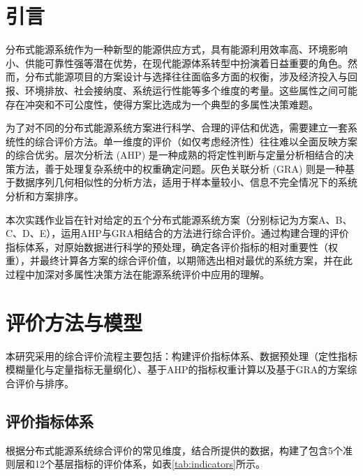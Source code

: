 \documentclass[12pt]{ctexart}
\begin{document}
\newpage
\section{引言}
分布式能源系统作为一种新型的能源供应方式，具有能源利用效率高、环境影响小、供能可靠性强等潜在优势，在现代能源体系转型中扮演着日益重要的角色。然而，分布式能源项目的方案设计与选择往往面临多方面的权衡，涉及经济投入与回报、环境排放、社会接纳度、系统运行性能等多个维度的考量。这些属性之间可能存在冲突和不可公度性，使得方案比选成为一个典型的多属性决策难题。

为了对不同的分布式能源系统方案进行科学、合理的评估和优选，需要建立一套系统性的综合评价方法。单一维度的评价（如仅考虑经济性）往往难以全面反映方案的综合优劣。层次分析法 (AHP) 是一种成熟的将定性判断与定量分析相结合的决策方法，善于处理复杂系统中的权重确定问题。灰色关联分析 (GRA) 则是一种基于数据序列几何相似性的分析方法，适用于样本量较小、信息不完全情况下的系统分析和方案排序。

本次实践作业旨在针对给定的五个分布式能源系统方案（分别标记为方案A、B、C、D、E），运用AHP与GRA相结合的方法进行综合评价。通过构建合理的评价指标体系，对原始数据进行科学的预处理，确定各评价指标的相对重要性（权重），并最终计算各方案的综合评价值，以期筛选出相对最优的系统方案，并在此过程中加深对多属性决策方法在能源系统评价中应用的理解。

\section{评价方法与模型}
本研究采用的综合评价流程主要包括：构建评价指标体系、数据预处理（定性指标模糊量化与定量指标无量纲化）、基于AHP的指标权重计算以及基于GRA的方案综合评价与排序。

\subsection{评价指标体系}
根据分布式能源系统综合评价的常见维度，结合所提供的数据，构建了包含5个准则层和12个基层指标的评价体系，如表\ref{tab:indicators}所示。
\end{document}
